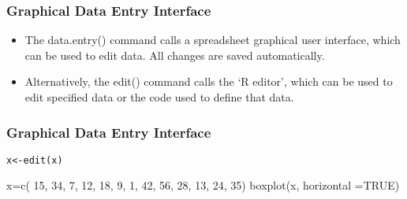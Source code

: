 
\begin{frame}[fragile]
\frametitle{Graphical Data Entry Interface}
\begin{itemize}

\item The data.entry() command calls a spreadsheet graphical user
interface, which can be used to edit data. All changes are saved
automatically.




\item Alternatively, the edit() command calls the `R editor',
which can be used to edit specified data or the code used to
define that data.
\end{itemize}
\end{frame}
\begin{frame}[fragile]
\frametitle{Graphical Data Entry Interface}
\begin{itemize}

\begin{verbatim}
x<-edit(x)
\end{verbatim}

\end{itemize}
\end{frame}



x=c( 15,  34,  7,  12,  18,  9, 1,  42,  56,  28,  13,  24, 35)
boxplot(x, horizontal =TRUE)
